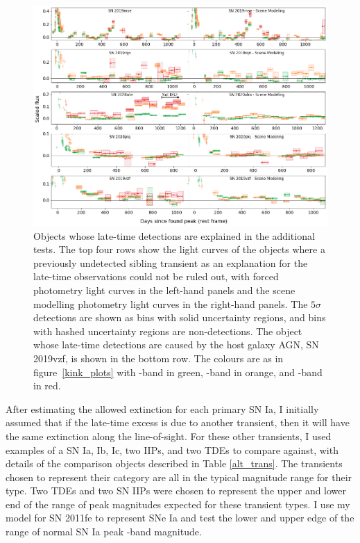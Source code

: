 \documentclass[a4paper,oneside,12pt, class=Latex/Classes/PhDthesisPSnPDF, crop=false]{standalone}
\begin{document}
\begin{figure}
 \centering
 \includegraphics[width=\textwidth]{../Images/chapter_3/other_alt_plots.png}
 \caption[Objects whose late-time signal can be explained without CSM.]{Objects whose late-time detections are explained in the additional tests. The top four rows show the light curves of the objects where a previously undetected sibling transient as an explanation for the late-time observations could not be ruled out, with forced photometry light curves in the left-hand panels and the scene modelling photometry light curves in the right-hand panels. The $5\sigma$ detections are shown as bins with solid uncertainty regions, and bins with hashed uncertainty regions are non-detections. The object whose late-time detections are caused by the host galaxy AGN, SN 2019vzf, is shown in the bottom row. The colours are as in figure~\ref{kink_plots} with \ztfg-band in green, \ztfr-band in orange, and \ztfi-band in red.}
 \label{other_alt}
\end{figure}

After estimating the allowed extinction for each primary SN Ia, I initially assumed that if the late-time excess is due to another transient, then it will have the same extinction along the line-of-sight. For these other transients, I used examples of a SN Ia, Ib, Ic, two IIPs, and two TDEs to compare against, with details of the comparison objects described in Table \ref{alt_trans}. The transients chosen to represent their category are all in the typical magnitude range for their type. Two TDEs and two SN IIPs were chosen to represent the upper and lower end of the range of peak magnitudes expected for these transient types. I use my model for SN 2011fe to represent SNe Ia and test the lower and upper edge of the range of normal SN Ia peak \ztfr-band magnitude.
\end{document}
